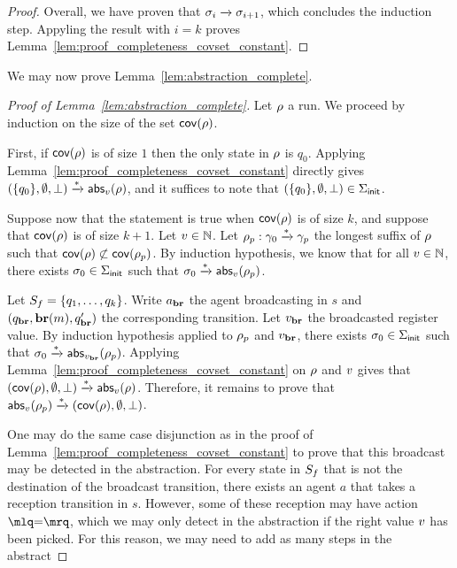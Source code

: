 \begin{proof}
Overall, we have proven that $\sigma_i \xrightarrow{} \sigma_{i+1}$, which concludes the induction step. Appyling the result with $i = k$ proves Lemma~\ref{lem:proof_completeness_covset_constant}. 

\end{proof}

We may now prove Lemma~\ref{lem:abstraction_complete}. 

\begin{proof}[Proof of Lemma~\ref{lem:abstraction_complete}]
Let $\rho$ a run.
We proceed by induction on the size of the set $\mathsf{cov}(\rho)$. 

First, if $\mathsf{cov}(\rho)$ is of size $1$ then the only state in $\rho$ is $q_0$. Applying Lemma~\ref{lem:proof_completeness_covset_constant} directly gives $(\{q_0\}, \emptyset, \bot) \xrightarrow{*} \mathsf{abs}_{v}(\rho)$, and it suffices to note that $(\{q_0\}, \emptyset, \bot) \in \Sigma_{\mathsf{init}}$. 


Suppose now that the statement is true when $\mathsf{cov}(\rho)$ is of size $k$, and suppose that $\mathsf{cov}(\rho)$ is of size $k+1$. Let $v \in \mathbb{N}$. Let $\rho_p: \gamma_0 \xrightarrow{*}\gamma_p$ the longest suffix of $\rho$ such that $\mathsf{cov}(\rho) \not \subset \mathsf{cov}(\rho_p)$. By induction hypothesis, we know that for all $v \in \mathbb{N}$, there exists $\sigma_0 \in \Sigma_{\mathsf{init}}$ such that $\sigma_0 \xrightarrow{*} \mathsf{abs}_{v}(\rho_p)$.

Let $S_f = \{q_1,\dots, q_k\}$. 
Write $a_{\textbf{br}}$ the agent broadcasting in $s$ and $(q_{\textbf{br}}, \textbf{br}(m), q_{\textbf{br}}')$ the corresponding transition. Let $v_{\textbf{br}}$ the broadcasted register value. By induction hypothesis applied to $\rho_p$ and $v_{\textbf{br}}$, there exists $\sigma_0 \in \Sigma_{\mathsf{init}}$ such that $\sigma_0 \xrightarrow{*} \mathsf{abs}_{v_{\textbf{br}}}(\rho_p)$. Applying Lemma~\ref{lem:proof_completeness_covset_constant} on $\rho$ and $v$ gives that $(\mathsf{cov}(\rho), \emptyset, \bot) \xrightarrow{*} \mathsf{abs}_{v}(\rho)$. Therefore, it remains to prove that $\mathsf{abs}_{v}(\rho_p) \xrightarrow{*} (\mathsf{cov}(\rho), \emptyset, \bot)$.

 One may do the same case disjunction as in the proof of Lemma~\ref{lem:proof_completeness_covset_constant} to prove that this broadcast may be detected in the abstraction. For every state in $S_f$ that is not the destination of the broadcast transition, there exists an agent $a$ that takes a reception transition in $s$. However, some of these reception may have action $\quotemarks{\eqtestact}$, which we may only detect in the abstraction if the right value $v$ has been picked. For this reason, we may need to add as many steps in the abstract 
\end{proof}


